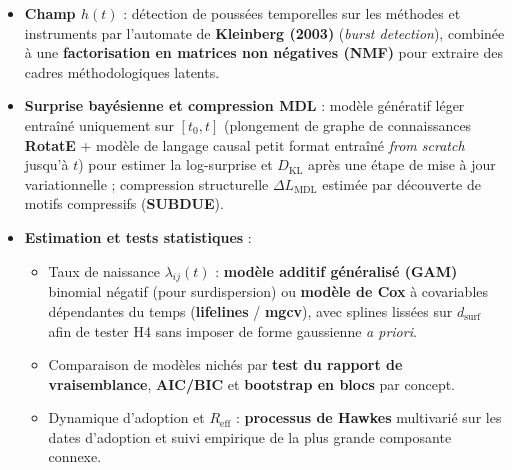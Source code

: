 \documentclass[a4paper,11pt]{article}
\providecommand{\tightlist}{\setlength{\itemsep}{0pt}\setlength{\parskip}{0pt}}
\begin{document}
\begin{itemize}
  \begin{itemize}
  \tightlist
  \item
    Criblage rapide par \textbf{Fused Gromov--Wasserstein} (Titouan et
    al., 2019) résolu par gradient conditionnel (\textbf{Frank--Wolfe}
    avec projections de \textbf{Sinkhorn--Knopp}, bibliothèque
    \textbf{POT}).
  \item
    Sur les paires candidates, alignement discret exact par
    \textbf{Structure-Mapping Engine (SME)} (Falkenhainer et al., 1989)
    ou recherche du plus grand sous-graphe commun étiqueté
    (\textbf{algorithme McSplit}), donnant directement
    \(\mathrm{Pres}\), \(\mathrm{Cov}\) et \(\mathrm{Conf}\).
  \item
    Pour les arbres d'équations, distance d'édition d'arbres par
    l'algorithme \textbf{APTED}.
  \end{itemize}
\item
  \textbf{Champ \(h(t)\)} : détection de poussées temporelles sur les
  méthodes et instruments par l'automate de \textbf{Kleinberg (2003)}
  (\emph{burst detection}), combinée à une \textbf{factorisation en
  matrices non négatives (NMF)} pour extraire des cadres méthodologiques
  latents.
\item
  \textbf{Surprise bayésienne et compression MDL} : modèle génératif
  léger entraîné uniquement sur \([t_0, t]\) (plongement de graphe de
  connaissances \textbf{RotatE} + modèle de langage causal petit format
  entraîné \emph{from scratch} jusqu'à \(t\)) pour estimer la
  log-surprise et \(D_{\mathrm{KL}}\) après une étape de mise à jour
  variationnelle ; compression structurelle \(\Delta L_{\mathrm{MDL}}\)
  estimée par découverte de motifs compressifs (\textbf{SUBDUE}).
\item
  \textbf{Estimation et tests statistiques} :

  \begin{itemize}
  \tightlist
  \item
    Taux de naissance \(\lambda_{ij}(t)\) : \textbf{modèle additif
    généralisé (GAM)} binomial négatif (pour surdispersion) ou
    \textbf{modèle de Cox} à covariables dépendantes du temps
    (\textbf{lifelines} / \textbf{mgcv}), avec splines lissées sur
    \(d_{\mathrm{surf}}\) afin de tester H4 sans imposer de forme
    gaussienne \emph{a priori}.
  \item
    Comparaison de modèles nichés par \textbf{test du rapport de
    vraisemblance}, \textbf{AIC/BIC} et \textbf{bootstrap en blocs} par
    concept.
  \item
    Dynamique d'adoption et \(R_{\mathrm{eff}}\) : \textbf{processus de
    Hawkes} multivarié sur les dates d'adoption et suivi empirique de la
    plus grande composante connexe.
  \end{itemize}
\end{itemize}
\end{document}
